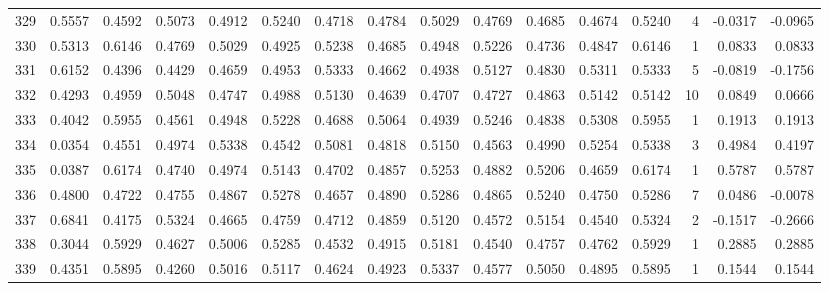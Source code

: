 \begin{tabular}{lrrrrrrrrrrrrrrr}
329 &      0.5557 &  0.4592 &  0.5073 &  0.4912 &  0.5240 &  0.4718 &  0.4784 &  0.5029 &  0.4769 &  0.4685 &   0.4674 &     0.5240 &      4 &                   -0.0317 &                    -0.0965 \\
330 &      0.5313 &  0.6146 &  0.4769 &  0.5029 &  0.4925 &  0.5238 &  0.4685 &  0.4948 &  0.5226 &  0.4736 &   0.4847 &     0.6146 &      1 &                    0.0833 &                     0.0833 \\
331 &      0.6152 &  0.4396 &  0.4429 &  0.4659 &  0.4953 &  0.5333 &  0.4662 &  0.4938 &  0.5127 &  0.4830 &   0.5311 &     0.5333 &      5 &                   -0.0819 &                    -0.1756 \\
332 &      0.4293 &  0.4959 &  0.5048 &  0.4747 &  0.4988 &  0.5130 &  0.4639 &  0.4707 &  0.4727 &  0.4863 &   0.5142 &     0.5142 &     10 &                    0.0849 &                     0.0666 \\
333 &      0.4042 &  0.5955 &  0.4561 &  0.4948 &  0.5228 &  0.4688 &  0.5064 &  0.4939 &  0.5246 &  0.4838 &   0.5308 &     0.5955 &      1 &                    0.1913 &                     0.1913 \\
334 &      0.0354 &  0.4551 &  0.4974 &  0.5338 &  0.4542 &  0.5081 &  0.4818 &  0.5150 &  0.4563 &  0.4990 &   0.5254 &     0.5338 &      3 &                    0.4984 &                     0.4197 \\
335 &      0.0387 &  0.6174 &  0.4740 &  0.4974 &  0.5143 &  0.4702 &  0.4857 &  0.5253 &  0.4882 &  0.5206 &   0.4659 &     0.6174 &      1 &                    0.5787 &                     0.5787 \\
336 &      0.4800 &  0.4722 &  0.4755 &  0.4867 &  0.5278 &  0.4657 &  0.4890 &  0.5286 &  0.4865 &  0.5240 &   0.4750 &     0.5286 &      7 &                    0.0486 &                    -0.0078 \\
337 &      0.6841 &  0.4175 &  0.5324 &  0.4665 &  0.4759 &  0.4712 &  0.4859 &  0.5120 &  0.4572 &  0.5154 &   0.4540 &     0.5324 &      2 &                   -0.1517 &                    -0.2666 \\
338 &      0.3044 &  0.5929 &  0.4627 &  0.5006 &  0.5285 &  0.4532 &  0.4915 &  0.5181 &  0.4540 &  0.4757 &   0.4762 &     0.5929 &      1 &                    0.2885 &                     0.2885 \\
339 &      0.4351 &  0.5895 &  0.4260 &  0.5016 &  0.5117 &  0.4624 &  0.4923 &  0.5337 &  0.4577 &  0.5050 &   0.4895 &     0.5895 &      1 &                    0.1544 &                     0.1544 \\

\end{tabular}
